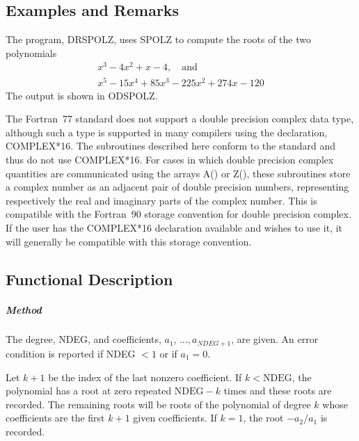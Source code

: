 \documentclass[twoside]{MATH77}
\begin{document}
\subsection{Examples and Remarks}

The program, DRSPOLZ, uses SPOLZ to compute the roots of the two polynomials%
\begin{gather*}
x^3-4x^2+x-4,\quad \text{and}\\
x^5-15x^4+85x^3-225x^2+274x-120
\end{gather*}
The output is shown in ODSPOLZ.

The Fortran~77 standard does not support a double precision complex data
type, although such a type is supported in many compilers using the
declaration, COMPLEX*16. The subroutines described here conform to the
standard and thus do not use COMPLEX*16. For cases in which double precision
complex quantities are communicated using the arrays A() or Z(), these
subroutines store a complex number as an adjacent pair of double precision
numbers, representing respectively the real and imaginary parts of the
complex number.  This is compatible with the Fortran~90 storage
convention for double precision complex.  If the user has the COMPLEX*16
declaration available and wishes to use it, it will generally be compatible
with this storage
convention.

\subsection{Functional Description}

\subparagraph{Method}

The degree, NDEG, and coefficients, $a_1$, $..., a_{NDEG+1}$, are given. An
error condition is reported if NDEG $< 1$ or if $a_1 = 0.$

Let $k+1$ be the index of the last nonzero coefficient. If $k<\text{NDEG}$, the
polynomial has a root at zero repeated $\text{NDEG}-k$ times and these roots
are recorded. The remaining roots will be roots of the polynomial of degree $k$
whose coefficients are the first $k+1$ given coefficients. If $k=1$, the
root $-a_2/a_1$ is recorded.
\end{document}
